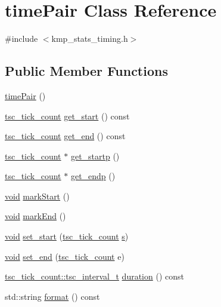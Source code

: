 \hypertarget{classtimePair}{\section{time\-Pair Class Reference}
\label{classtimePair}
}


{\ttfamily \#include $<$kmp\-\_\-stats\-\_\-timing.\-h$>$}

\subsection*{Public Member Functions}
\begin{DoxyCompactItemize}
\item 
\hyperlink{classtimePair_af057b4a787e11dd007fb9090b298afdc}{time\-Pair} ()
\item 
\hyperlink{classtsc__tick__count}{tsc\-\_\-tick\-\_\-count} \hyperlink{classtimePair_a7af123512477108c0b46f3c7062d994b}{get\-\_\-start} () const 
\item 
\hyperlink{classtsc__tick__count}{tsc\-\_\-tick\-\_\-count} \hyperlink{classtimePair_ad4cc4f6099a6864c91d26f2437a5e907}{get\-\_\-end} () const 
\item 
\hyperlink{classtsc__tick__count}{tsc\-\_\-tick\-\_\-count} $\ast$ \hyperlink{classtimePair_ace8f5405c26695c59b3f1db21caf8d08}{get\-\_\-startp} ()
\item 
\hyperlink{classtsc__tick__count}{tsc\-\_\-tick\-\_\-count} $\ast$ \hyperlink{classtimePair_acd98701ab5237691ab90ab5eebe4c98d}{get\-\_\-endp} ()
\item 
\hyperlink{ittnotify__static_8h_af941d56e55e3c5465135b60c4d6343ed}{void} \hyperlink{classtimePair_a0dd86a61ee6ac6dbbc2a1857708afe7c}{mark\-Start} ()
\item 
\hyperlink{ittnotify__static_8h_af941d56e55e3c5465135b60c4d6343ed}{void} \hyperlink{classtimePair_ad4a2729e5836e46c49e847924a935976}{mark\-End} ()
\item 
\hyperlink{ittnotify__static_8h_af941d56e55e3c5465135b60c4d6343ed}{void} \hyperlink{classtimePair_ac2a974eb5a24df4ff9188f22a4ddbf1c}{set\-\_\-start} (\hyperlink{classtsc__tick__count}{tsc\-\_\-tick\-\_\-count} \hyperlink{ittnotify__static_8h_a110bd9ede250f97ce56d81bb3c7b171d}{s})
\item 
\hyperlink{ittnotify__static_8h_af941d56e55e3c5465135b60c4d6343ed}{void} \hyperlink{classtimePair_a50cea5ded4caaf67a9d08c10c7e91cad}{set\-\_\-end} (\hyperlink{classtsc__tick__count}{tsc\-\_\-tick\-\_\-count} e)
\item 
\hyperlink{classtsc__tick__count_1_1tsc__interval__t}{tsc\-\_\-tick\-\_\-count\-::tsc\-\_\-interval\-\_\-t} \hyperlink{classtimePair_ab3171fe115bf35513f8caf0105db7f6c}{duration} () const 
\item 
std\-::string \hyperlink{classtimePair_a514387492d377869af009ed9f17994e3}{format} () const 
\end{DoxyCompactItemize}
